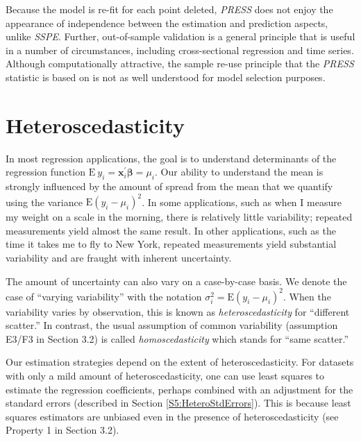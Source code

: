 Because the model is re-fit for each point deleted, \textit{PRESS}
does not enjoy the appearance of independence between the estimation
and prediction aspects, unlike \textit{SSPE}. Further, out-of-sample
validation is a general principle that is useful in a number of
circumstances, including cross-sectional regression and time series.
Although computationally attractive, the sample re-use principle
that the \textit{PRESS} statistic is based on is not as well
understood for model selection purposes.



\section{Heteroscedasticity}\label{S5:Heteroscedasticity}

In most regression applications, the goal is to understand
determinants of the regression function $\mathrm{E~}y_i =
\mathbf{x}_i^{\prime} \boldsymbol \beta =\mu_i$. Our ability to
understand the mean is strongly influenced by the amount of spread
from the mean that we quantify using the variance
$\mathrm{E}\left(y_i-\mu_i\right)^2$. In some applications, such as
when I measure my weight on a scale in the morning, there is
relatively little variability; repeated measurements yield almost
the same result. In other applications, such as the time it takes me
to fly to New York, repeated measurements yield substantial
variability and are fraught with inherent uncertainty.

The amount of uncertainty can also vary on a case-by-case basis. We
denote the case of ``varying variability'' with the notation
$\sigma_i^2=\mathrm{E}\left(y_i-\mu_i\right)^2$. When the
variability varies by observation, this is known as
\emph{heteroscedasticity} for ``different scatter.''  In contrast,
the usual assumption of common variability (assumption E3/F3 in
Section 3.2) is called \textit{homoscedasticity} which stands for
``same scatter.''

Our estimation strategies depend on the extent of
heteroscedasticity. For datasets with only a mild amount of
heteroscedasticity, one can use least squares to estimate the
regression coefficients, perhaps combined with an adjustment for the
standard errors (described in Section \ref{S5:HeteroStdErrors}).
This is because least squares estimators are unbiased even in the
presence of heteroscedasticity (see Property 1 in Section 3.2).

